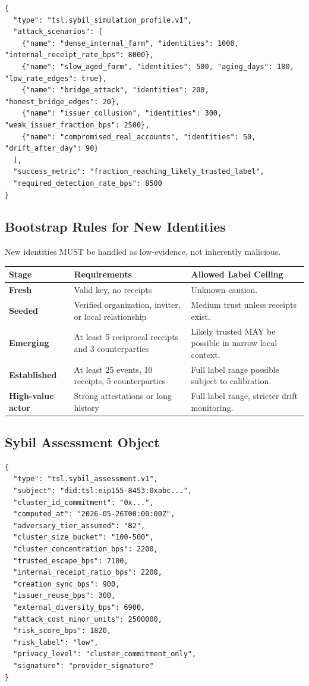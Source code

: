 \documentclass[11pt]{article}
\begin{document}
\begin{lstlisting}[style=tslcode]
{
  "type": "tsl.sybil_simulation_profile.v1",
  "attack_scenarios": [
    {"name": "dense_internal_farm", "identities": 1000, "internal_receipt_rate_bps": 8000},
    {"name": "slow_aged_farm", "identities": 500, "aging_days": 180, "low_rate_edges": true},
    {"name": "bridge_attack", "identities": 200, "honest_bridge_edges": 20},
    {"name": "issuer_collusion", "identities": 300, "weak_issuer_fraction_bps": 2500},
    {"name": "compromised_real_accounts", "identities": 50, "drift_after_day": 90}
  ],
  "success_metric": "fraction_reaching_likely_trusted_label",
  "required_detection_rate_bps": 8500
}
\end{lstlisting}

\subsection{Bootstrap Rules for New Identities}

New identities MUST be handled as low-evidence, not inherently malicious.

\begin{center}
\begin{tabularx}{\textwidth}{>{\bfseries}p{} p{} X}
\toprule
Stage & Requirements & Allowed Label Ceiling \\
\midrule
Fresh & Valid key, no receipts & Unknown caution. \\
Seeded & Verified organization, inviter, or local relationship & Medium trust unless receipts exist. \\
Emerging & At least 5 reciprocal receipts and 3 counterparties & Likely trusted MAY be possible in narrow local context. \\
Established & At least 25 events, 10 receipts, 5 counterparties & Full label range possible subject to calibration. \\
High-value actor & Strong attestations or long history & Full label range, stricter drift monitoring. \\
\bottomrule
\end{tabularx}
\end{center}

\subsection{Sybil Assessment Object}

\begin{lstlisting}[style=tslcode]
{
  "type": "tsl.sybil_assessment.v1",
  "subject": "did:tsl:eip155-8453:0xabc...",
  "cluster_id_commitment": "0x...",
  "computed_at": "2026-05-26T00:00:00Z",
  "adversary_tier_assumed": "B2",
  "cluster_size_bucket": "100-500",
  "cluster_concentration_bps": 2200,
  "trusted_escape_bps": 7100,
  "internal_receipt_ratio_bps": 2200,
  "creation_sync_bps": 900,
  "issuer_reuse_bps": 300,
  "external_diversity_bps": 6900,
  "attack_cost_minor_units": 2500000,
  "risk_score_bps": 1820,
  "risk_label": "low",
  "privacy_level": "cluster_commitment_only",
  "signature": "provider_signature"
}
\end{lstlisting}
\end{document}
